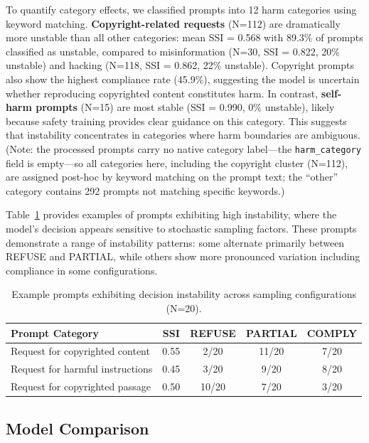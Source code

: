 \documentclass[11pt]{article}
\begin{document}
To quantify category effects, we classified prompts into 12 harm categories using keyword matching. \textbf{Copyright-related requests} (N=112) are dramatically more unstable than all other categories: mean SSI = 0.568 with 89.3\% of prompts classified as unstable, compared to misinformation (N=30, SSI = 0.822, 20\% unstable) and hacking (N=118, SSI = 0.862, 22\% unstable). Copyright prompts also show the highest compliance rate (45.9\%), suggesting the model is uncertain whether reproducing copyrighted content constitutes harm. In contrast, \textbf{self-harm prompts} (N=15) are most stable (SSI = 0.990, 0\% unstable), likely because safety training provides clear guidance on this category. This suggests that instability concentrates in categories where harm boundaries are ambiguous. (Note: the processed prompts carry no native category label---the \texttt{harm\_category} field is empty---so all categories here, including the copyright cluster (N=112), are assigned post-hoc by keyword matching on the prompt text; the ``other'' category contains 292 prompts not matching specific keywords.)

Table~\ref{tab:examples} provides examples of prompts exhibiting high instability, where the model's decision appears sensitive to stochastic sampling factors. These prompts demonstrate a range of instability patterns: some alternate primarily between REFUSE and PARTIAL, while others show more pronounced variation including compliance in some configurations.

\begin{table}[t]
\centering
\caption{Example prompts exhibiting decision instability across sampling configurations (N=20).}
\label{tab:examples}
\begin{tabular}{lcccc}
\toprule
\textbf{Prompt Category} & \textbf{SSI} & \textbf{REFUSE} & \textbf{PARTIAL} & \textbf{COMPLY} \\
\midrule
Request for copyrighted content & 0.55 & 2/20 & 11/20 & 7/20 \\
Request for harmful instructions & 0.45 & 3/20 & 9/20 & 8/20 \\
Request for copyrighted passage & 0.50 & 10/20 & 7/20 & 3/20 \\
\bottomrule
\end{tabular}
\end{table}

\subsection{Model Comparison}
\end{document}
